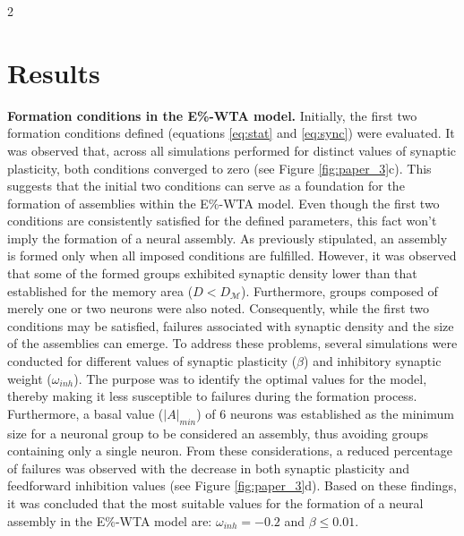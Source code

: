 \documentclass[a4paper, 10pt]{article}
\begin{document}
\begin{multicols}{2}

\section*{Results}

\noindent\textbf{Formation conditions in the E\%-WTA model.} Initially, the first two formation conditions defined (equations \eqref{eq:stat} and \eqref{eq:sync}) were evaluated. It was observed that, across all simulations performed for distinct values of synaptic plasticity, both conditions converged to zero (see Figure \ref{fig:paper_3}c). This suggests that the initial two conditions can serve as a foundation for the formation of assemblies within the E\%-WTA model. Even though the first two conditions are consistently satisfied for the defined parameters, this fact won't imply the formation of a neural assembly. As previously stipulated, an assembly is formed only when all imposed conditions are fulfilled. However, it was observed that some of the formed groups exhibited synaptic density lower than that established for the memory area ($D < D_{\mathcal{M}}$). Furthermore, groups composed of merely one or two neurons were also noted. Consequently, while the first two conditions may be satisfied, failures associated with synaptic density and the size of the assemblies can emerge. To address these problems, several simulations were conducted for different values of synaptic plasticity ($\beta$) and inhibitory synaptic weight ($\omega_{inh}$). The purpose was to identify the optimal values for the model, thereby making it less susceptible to failures during the formation process. Furthermore, a basal value ($|A|_{min}$) of $6$ neurons was established as the minimum size for a neuronal group to be considered an assembly, thus avoiding groups containing only a single neuron. From these considerations, a reduced percentage of failures was observed with the decrease in both synaptic plasticity and feedforward inhibition values (see Figure \ref{fig:paper_3}d). Based on these findings, it was concluded that the most suitable values for the formation of a neural assembly in the E\%-WTA model are: $\omega_{inh} = - 0.2$ and $\beta \leq 0.01$.\newline
\end{multicols}
\end{document}
